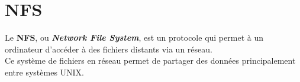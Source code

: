 \section{NFS}
\label{sec:nfs}

Le \textbf{NFS}, ou \textit{\textbf{Network File System}}, est un protocole qui
permet à un ordinateur d'accéder à des fichiers distants via un réseau. \\
Ce système de fichiers en réseau permet de partager des données principalement
entre systèmes UNIX.

